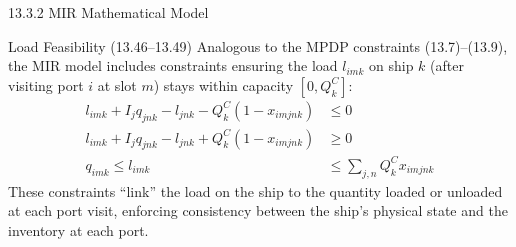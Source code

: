 \documentclass[aspectratio=169,10pt]{beamer}
\begin{document}
\begin{frame}[allowframebreaks]{13.3.2 MIR Mathematical Model}
  \begin{block}{Load Feasibility (13.46--13.49)}
    Analogous to the MPDP constraints (13.7)--(13.9), the MIR model includes
    constraints ensuring the load $l_{imk}$ on ship $k$ (after visiting
    port $i$ at slot $m$) stays within capacity $[0, Q_k^C]$:
    \begin{align}
      l_{imk} + I_j q_{jnk} - l_{jnk} - Q_k^C(1 - x_{imjnk}) &\leq 0
      \tag{13.46} \\
      l_{imk} + I_j q_{jnk} - l_{jnk} + Q_k^C(1 - x_{imjnk}) &\geq 0
      \tag{13.47} \\
      q_{imk} \leq l_{imk} &\leq \sum_{j,n} Q_k^C x_{imjnk}
      \tag{13.48}
    \end{align}
    These constraints ``link'' the load on the ship to the quantity loaded
    or unloaded at each port visit, enforcing consistency between the ship's
    physical state and the inventory at each port.
  \end{block}
\end{frame}
\end{document}
